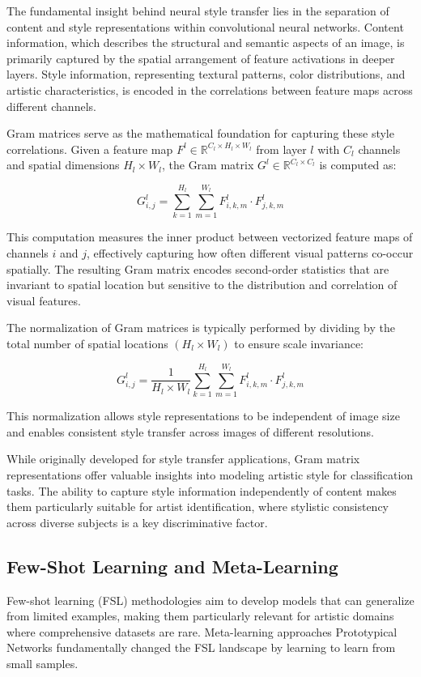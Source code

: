 \documentclass[conference,6pt]{IEEEtran}
\begin{document}
The fundamental insight behind neural style transfer lies in the separation of content and style representations within convolutional neural networks. Content information, which describes the structural and semantic aspects of an image, is primarily captured by the spatial arrangement of feature activations in deeper layers. Style information, representing textural patterns, color distributions, and artistic characteristics, is encoded in the correlations between feature maps across different channels.

Gram matrices serve as the mathematical foundation for capturing these style correlations. Given a feature map $F^l \in \mathbb{R}^{C_l \times H_l \times W_l}$ from layer $l$ with $C_l$ channels and spatial dimensions $H_l \times W_l$, the Gram matrix $G^l \in \mathbb{R}^{C_l \times C_l}$ is computed as:

\[
G^l_{i,j} = \sum_{k=1}^{H_l} \sum_{m=1}^{W_l} F^l_{i,k,m} \cdot F^l_{j,k,m}
\]

This computation measures the inner product between vectorized feature maps of channels $i$ and $j$, effectively capturing how often different visual patterns co-occur spatially. The resulting Gram matrix encodes second-order statistics that are invariant to spatial location but sensitive to the distribution and correlation of visual features.

The normalization of Gram matrices is typically performed by dividing by the total number of spatial locations $(H_l \times W_l)$ to ensure scale invariance:

\[
G^l_{i,j} = \frac{1}{H_l \times W_l} \sum_{k=1}^{H_l} \sum_{m=1}^{W_l} F^l_{i,k,m} \cdot F^l_{j,k,m}
\]

This normalization allows style representations to be independent of image size and enables consistent style transfer across images of different resolutions.

While originally developed for style transfer applications, Gram matrix representations offer valuable insights into modeling artistic style for classification tasks. The ability to capture style information independently of content makes them particularly suitable for artist identification, where stylistic consistency across diverse subjects is a key discriminative factor.

\subsection{Few-Shot Learning and Meta-Learning}
Few-shot learning (FSL) methodologies aim to develop models that can generalize from limited examples, making them particularly relevant for artistic domains where comprehensive datasets are rare. Meta-learning approaches Prototypical Networks \cite{ProtoNet}  fundamentally changed the FSL landscape by learning to learn from small samples.
\end{document}
